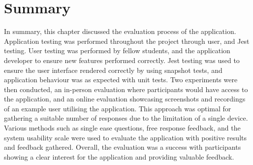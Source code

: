 \section{Summary}

In summary, this chapter discussed the evaluation process of the application. Application testing was performed throughout the project through user, and Jest testing. User testing was performed by fellow students, and the application developer to ensure new features performed correctly. Jest testing was used to ensure the user interface rendered correctly by using snapshot tests, and application behaviour was as expected with unit tests. Two experiments were then conducted, an in-person evaluation where participants would have access to the application, and an online evaluation showcasing screenshots and recordings of an example user utilising the application. This approach was optimal for gathering a suitable number of responses due to the limitation of a single device. Various methods such as single ease questions, free response feedback, and the system usability scale were used to evaluate the application with positive results and feedback gathered. Overall, the evaluation was a success with participants showing a clear interest for the application and providing valuable feedback. 
